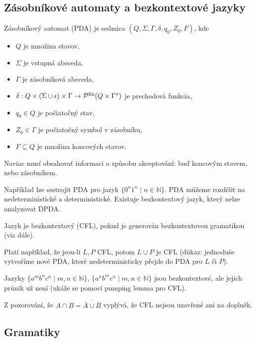 \subsection{Zásobníkové automaty a bezkontextové jazyky}

\begin{definition}
    Zásobníkový automat (PDA) je sedmica $(Q, \Sigma, \Gamma, \delta, q_0, Z_0,F)$, kde
	\begin{itemize}
		\item $Q$ je množina stavov,
		\item $\Sigma$ je vstupná abeceda,
		\item $\Gamma$ je zásobníková abeceda,
		\item $\delta : Q \times (\Sigma \cup \epsilon) \times \Gamma \to \mathcal{P}^{\text{fin}}(Q \times \Gamma^*)$ je prechodová funkcia,
		\item $q_0 \in Q$ je počiatočný stav,
		\item $Z_0 \in \Gamma$ je počiatočný symbol v zásobníku,
		\item $F \subseteq Q$ je množina koncových stavov.
	\end{itemize}
    Naviac musí obsahovať informaci o způsobu akceptování: buď koncovým stavem, nebo
    zásobníkem.
\end{definition}

Například lze sestrojit PDA pro jazyk
$\{ 0^n 1^n \mid n \in \mathbb{N} \}$.
PDA můžeme rozdělit na nedeterministické a deterministické. Existuje
bezkontextový jazyk, který nelze analyzovat DPDA.

\begin{definition}
    Jazyk je bezkontextový (CFL), pokud je generován bezkontextovou
    gramatikou (viz dále).
\end{definition}

Platí například, že jsou-li $L, P$ CFL, potom $L \cup P$ je CFL (důkaz:
jednoduše vytvoříme nové PDA, které nedeterministicky přejde do PDA pro
$L$ či $P$).

\begin{example}
    Jazyky
    $\{ a^m b^n c^n \mid m, n \in \mathbb{N} \}$,
    $\{ a^n b^m c^n \mid m, n \in \mathbb{N} \}$
    jsou bezkontextové, ale
    jejich průnik už není (ukáže se pomocí pumping lemma pro CFL).

    Z pozorování, že
    $A \cap B = \overline{\overline{A} \cup \overline{B}}$
    vyplývá, že CFL nejsou uzavřené ani na doplněk.
\end{example}

\subsection{Gramatiky}

